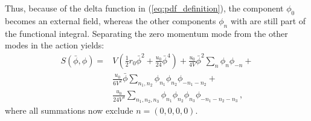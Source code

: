 \documentclass[11pt,a4paper]{article}
\begin{document}
Thus, because of the delta function in (\ref{eq:pdf_definition}), the component
$\phi_{0}$ becomes an external field, whereas the other components $\phi_{n}$
with are still part of the functional integral. Separating the zero momentum
mode from the other modes in the action yields:
\begin{equation}
\begin{split}
    S(\bar{\phi}, \phi) =& 
    V \left(\frac{1}{2} r_0 \bar{\phi}^2 + \frac{u_0}{24} \bar{\phi}^4\right) +
    \frac{u_0}{4V} \bar{\phi}^2 \sum_{n} \phi_{n} \phi_{-n} + \\
    &\frac{u_0}{6V^2} \bar{\phi} 
        \sum_{n_1, n_2} \phi_{n_1} \phi_{n_2} \phi_{-n_1 -n_2} + \\
    &\frac{u_0}{24V^3} \sum_{n_1, n_2, n_3} \phi_{n_1} \phi_{n_2} 
        \phi_{n_3} \phi_{-n_1 -n_2 -n_3}\,,
\end{split}
\end{equation}
where all summations now exclude $n = (0, 0, 0, 0)$.
\end{document}
